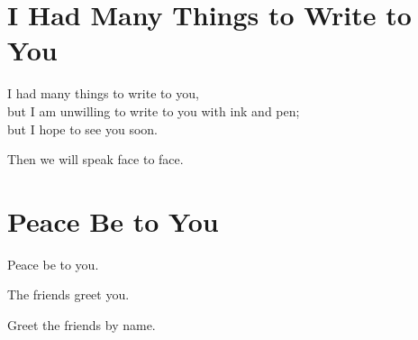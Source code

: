 \newpage\section{I Had Many Things to Write to You}

I had many things to write to you,
\\
but I am unwilling to write to you with ink and pen;
\\
but I hope to see you soon.

Then we will speak face to face.

\newpage\section{Peace Be to You}

Peace be to you.

The friends greet you.

Greet the friends by name.

